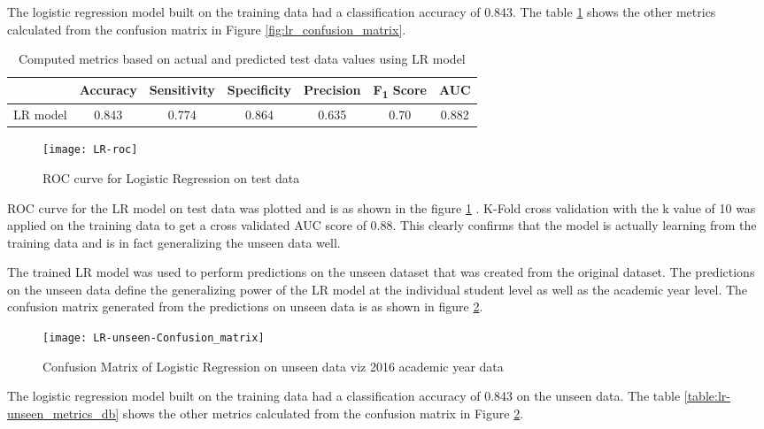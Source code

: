 \documentclass[11pt,openright]{report}
\begin{document}
The logistic regression model built on the training data had a classification accuracy of 0.843. The table \ref{table:lr-metrics_db} shows the other metrics calculated from the confusion matrix in Figure \ref{fig:lr_confusion_matrix}. 
\begin{table} [!htb]
	\renewcommand{\arraystretch}{1.3}
	\caption{Computed metrics based on actual and predicted test data values using LR model}
	\label{table:lr-metrics_db}
	\centering
	\begin{tabular}{|c|c|c|c|c|c|c|}
    \hline
  	 & \bfseries Accuracy & \bfseries Sensitivity & \bfseries Specificity & \bfseries Precision & \bfseries F\textsubscript{1} Score  & \bfseries AUC\\  
    \hline
	LR model & 0.843 & 0.774 & 0.864 & 0.635 & 0.70 & 0.882 \\ \hline
	\end{tabular} 
\end{table}


 \begin{figure}[!htb]
	\centering
	\texttt{[image: LR-roc]}
	\caption{ROC curve for Logistic Regression on test data}
	\label{fig:lr_roc}
\end{figure} 

ROC curve for the LR model on test data was plotted and is as shown in the figure \ref{fig:lr_roc} . K-Fold cross validation with the k value of 10 was applied on the training data to get a cross validated AUC score of 0.88. This clearly confirms that the model is actually learning from the training data and is in fact generalizing the unseen data well.

The trained LR model was used to perform predictions on the unseen dataset that was created from the original dataset. The predictions on the unseen data define the generalizing power of the LR model at the individual student level as well as the academic year level. The confusion matrix generated from the predictions on unseen data is as shown in figure \ref{fig:lr_unseen_confusion_matrix}.

  \begin{figure}[!htb]
	\centering
	\texttt{[image: LR-unseen-Confusion\_matrix]}
	\caption{Confusion Matrix of Logistic Regression on unseen data viz 2016 academic year data}
	\label{fig:lr_unseen_confusion_matrix}
\end{figure} 


The logistic regression model built on the training data had a classification accuracy of 0.843 on the unseen data. The table \ref{table:lr-unseen_metrics_db} shows the other metrics calculated from the confusion matrix in Figure \ref{fig:lr_unseen_confusion_matrix}.
\end{document}
